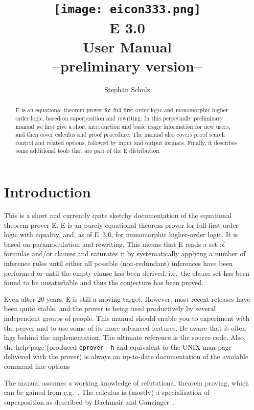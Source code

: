 \documentclass{report}
\author{Stephan Schulz}
\title{\texttt{[image: eicon333.png]}\\[5ex]E 3.0\\[1.5ex]User Manual\\[1.5ex]{\normalsize --preliminary
    version--}}
\begin{document}
\maketitle{}

\begin{abstract}
  E is an equational theorem prover for full first-order logic and
  monomorphic higher-order logic, based on superposition and
  rewriting. In this perpetually preliminary manual we first give a
  short introduction and basic usage information for new users, and
  then cover calculus and proof procedure. The manual also covers
  proof search control and related options, followed by input and
  output formats. Finally, it describes some additional tools that are
  part of the E distribution.
\end{abstract}

\tableofcontents{}

\chapter{Introduction}
\label{sec:intro}

This is a short and currently quite sketchy documentation of the
equational theorem prover E. E is an purely equational theorem prover
for full first-order logic with equality, and, as of E~3.0, for
monomorphic higher-order logic. It is based on paramodulation and
rewriting. This means that E reads a set of formulas and/or clauses
and saturates it by systematically applying a number of inference
rules until either all possible (non-redundant) inferences have been
performed or until the empty clause has been derived, i.e.\ the clause
set has been found to be unsatisfiable and thus the conjecture has
been proved.

Even after 20 years, E is still a moving target. However, most recent
releases have been quite stable, and the prover is being used
productively by several independent groups of people. This manual
should enable you to experiment with the prover and to use some of its
more advanced features. Be aware that it often lags behind the
implementation. The ultimate reference is the source code. Also, the
help page (produced \texttt{eprover -h} and equivalent to the UNIX man
page delivered with the prover) is always an up-to-date documentation
of the available command line options

The manual assumes a working knowledge of refutational theorem
proving, which can be gained from e.g.~\cite{CL73}. The calculus is
(mostly) a specialisation of superposition as described by Bachmair
and Ganzinger~\cite{BG94}.
\end{document}
